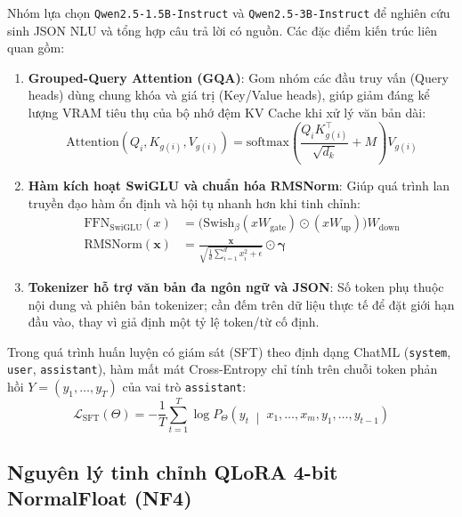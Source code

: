 Nhóm lựa chọn \texttt{Qwen2.5-1.5B-Instruct} và \texttt{Qwen2.5-3B-Instruct} \cite{qwen25_2024} để nghiên cứu sinh JSON NLU và tổng hợp câu trả lời có nguồn. Các đặc điểm kiến trúc liên quan gồm:
\begin{enumerate}[nosep]
  \item \textbf{Grouped-Query Attention (GQA)}: Gom nhóm các đầu truy vấn (Query heads) dùng chung khóa và giá trị (Key/Value heads), giúp giảm đáng kể lượng VRAM tiêu thụ của bộ nhớ đệm KV Cache khi xử lý văn bản dài:
  \begin{equation}
    \text{Attention}(Q_i, K_{g(i)}, V_{g(i)}) = \text{softmax}\!\left(\frac{Q_i K_{g(i)}^\top}{\sqrt{d_k}} + M\right) V_{g(i)}
    \label{eq:gqa_attention}
  \end{equation}
  \item \textbf{Hàm kích hoạt SwiGLU và chuẩn hóa RMSNorm}: Giúp quá trình lan truyền đạo hàm ổn định và hội tụ nhanh hơn khi tinh chỉnh:
  \begin{equation}
  \begin{aligned}
    \text{FFN}_{\text{SwiGLU}}(x) &= \Big( \text{Swish}_{\beta}(x W_{\text{gate}}) \odot (x W_{\text{up}}) \Big) W_{\text{down}} \\[4pt]
    \text{RMSNorm}(\mathbf{x}) &= \frac{\mathbf{x}}{\sqrt{\frac{1}{d}\sum_{i=1}^d x_i^2 + \epsilon}} \odot \boldsymbol{\gamma}
  \end{aligned}
  \label{eq:swiglu_rmsnorm}
  \end{equation}
  \item \textbf{Tokenizer hỗ trợ văn bản đa ngôn ngữ và JSON}: Số token phụ thuộc nội dung và phiên bản tokenizer; cần đếm trên dữ liệu thực tế để đặt giới hạn đầu vào, thay vì giả định một tỷ lệ token/từ cố định.
\end{enumerate}

Trong quá trình huấn luyện có giám sát (SFT) theo định dạng ChatML (\texttt{system}, \texttt{user}, \texttt{assistant}), hàm mất mát Cross-Entropy chỉ tính trên chuỗi token phản hồi $Y = (y_1, \dots, y_T)$ của vai trò \texttt{assistant}:
\begin{equation}
  \mathcal{L}_{\text{SFT}}(\Theta) = -\frac{1}{T} \sum_{t=1}^{T} \log P_{\Theta}\!\left(y_t \;\middle|\; x_1, \dots, x_m, y_1, \dots, y_{t-1}\right)
  \label{eq:sft_loss}
\end{equation}

\subsection{Nguyên lý tinh chỉnh QLoRA 4-bit NormalFloat (NF4)}

